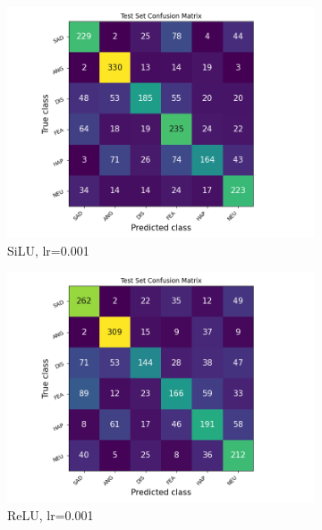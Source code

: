 \begin{figure}[h]
    \centering
    \begin{subfigure}[b]{0.32\textwidth}
        \includegraphics[width=\textwidth]{1D/lr0.001-SiLU-1D-CF.png}
        \caption{SiLU, lr=0.001}
    \end{subfigure}
    \begin{subfigure}[b]{0.32\textwidth}
        \includegraphics[width=\textwidth]{1D/lr0.001-ReLU-1D-CF.png}
        \caption{ReLU, lr=0.001}
    \end{subfigure}
    \begin{subfigure}[b]{0.32\textwidth}

\end{subfigure}
\end{figure}
